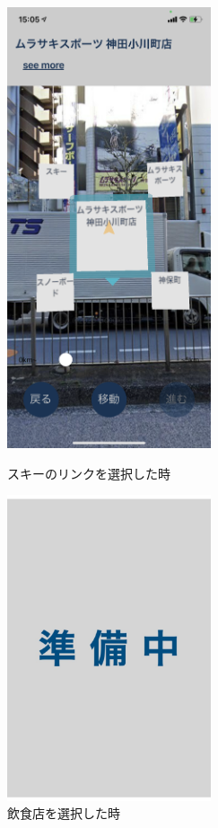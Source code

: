 \begin{figure}[h]
  \begin{minipage}{0.5\hsize}
    \centering
    \includegraphics[width=60mm]{images/ar_navigation_jibotyo_ski.png}
    \caption{スキーのリンクを選択した時} \label{fig:ar_navigation_jibotyo_ski}
  \end{minipage}
  \begin{minipage}{0.5\hsize}
    \centering
    \includegraphics[width=60mm]{images/wip2.jpg}
    \caption{飲食店を選択した時} \label{fig:ar_navigation_jibotyo_lunch}
  \end{minipage}
\end{figure}



